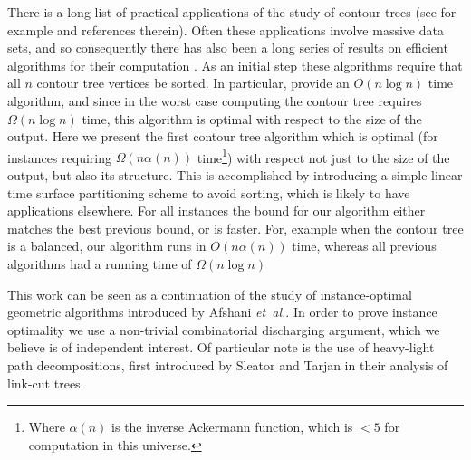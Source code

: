 \documentclass[11pt]{article}
\theoremstyle{definition}
\newcommand{\etal}{\textit{et~al.}\xspace}
\begin{document}
There is a long list of practical applications of the study of contour trees (see for example \cite{c-tmi-04} and references therein).
Often these applications involve massive data sets, and so consequently there has also been a long series 
of results on efficient algorithms for their computation \cite{kobps-ctsssit-97,tv-cct-98,csa-cctad-00,pc-ectls-02,cllr-sooscctmp-05}.
As an initial step these algorithms require that all $n$ contour tree vertices be sorted.  
In particular, \cite{cllr-sooscctmp-05} provide an $O(n\log n)$ time algorithm, and since in the worst case computing the contour tree 
requires $\Omega(n\log n)$ time, this algorithm is optimal with respect to the size of the output.  
Here we present the first contour tree algorithm which is optimal (for instances requiring $\Omega(n\alpha(n))$ 
time\footnote{Where $\alpha(n)$ is the inverse Ackermann function, which is $< 5$ for computation in this universe.}) 
with respect not just to the size of the output, but also its structure.  This is accomplished by introducing a simple linear time 
surface partitioning scheme to avoid sorting, which is likely to have applications elsewhere.  
For all instances the bound for our algorithm either matches the best previous bound, or is faster.
For, example when the contour tree is a balanced, our algorithm runs in $O(n\alpha(n))$ time, whereas all 
previous algorithms had a running time of $\Omega(n\log n)$


This work can be seen as a continuation of the study of instance-optimal geometric algorithms introduced by Afshani \etal \cite{abc-ioga-09}.
In order to prove instance optimality we use a non-trivial combinatorial discharging argument, which we believe is of independent interest.
Of particular note is the use of heavy-light path decompositions, first introduced by Sleator and Tarjan \cite{st-dsdt-83} in their analysis of link-cut trees.
\end{document}
